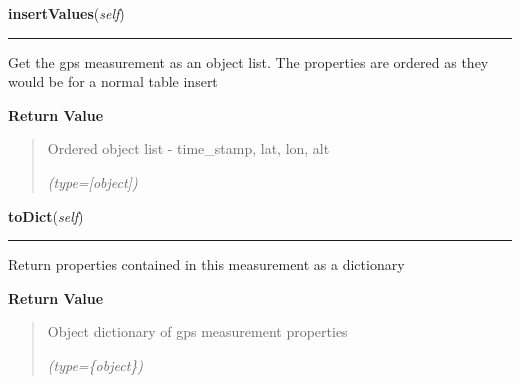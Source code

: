 \hspace{.8\funcindent}\begin{boxedminipage}{\funcwidth}

    \raggedright \textbf{insertValues}(\textit{self})

    \vspace{-1.5ex}

    \rule{\textwidth}{0.5\fboxrule}
\setlength{\parskip}{2ex}
    Get the gps measurement as an object list. The properties are ordered 
    as they would be for a normal table insert

\setlength{\parskip}{1ex}
      \textbf{Return Value}
    \vspace{-1ex}

      \begin{quote}
      Ordered object list - time\_stamp, lat, lon, alt

      {\it (type=[object])}

      \end{quote}

    \end{boxedminipage}

    \label{src:dao:model:incoming_gps:incoming_gps:toDict}

    \vspace{0.5ex}

\hspace{.8\funcindent}\begin{boxedminipage}{\funcwidth}

    \raggedright \textbf{toDict}(\textit{self})

    \vspace{-1.5ex}

    \rule{\textwidth}{0.5\fboxrule}
\setlength{\parskip}{2ex}
    Return properties contained in this measurement as a dictionary

\setlength{\parskip}{1ex}
      \textbf{Return Value}
    \vspace{-1ex}

      \begin{quote}
      Object dictionary of gps measurement properties

      {\it (type=\{object\})}

      \end{quote}

    \end{boxedminipage}

